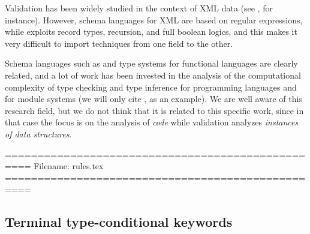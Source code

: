 Validation has been widely studied in the context of XML data (see \citep{DBLP:journals/tods/MartensNSB06,DBLP:journals/siamcomp/MartensNS09}, for instance). 
However, schema languages for XML are based on regular expressions, while {\JS} exploits record types, recursion, and full boolean logics, and this
makes it very difficult to import techniques from one field to the other.


Schema languages such as {\JS} and type systems for functional languages are clearly related, and
a lot of work has been invested in the analysis of the computational complexity of type checking and type inference
for programming languages and for module systems (we will only cite \citep{DBLP:journals/jfp/HengleinM94}, as an example).
We are well aware of this research field, but we do 
not think that it is related to this specific work, since in that case the focus is on the analysis of \emph{code} while
{\JS} validation analyzes \emph{instances of data structures}.




==================================================
Filename: rules.tex
==================================================




\hide{
\adcomm
\adescr
\adefault
\adefs  -----------
\addefs
\atitle
\aname
\atags
\acomment
\aid
\adid
\adschema
\ada
\addref
\adda
}

\subsection{Terminal type-conditional keywords}\label{sec:typecond}

